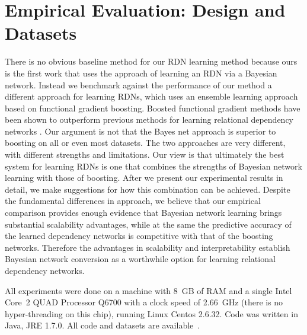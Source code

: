 \documentclass[runningheads,a4paper]{llncs}
\begin{document}
\section{Empirical Evaluation: Design and Datasets}\label{sec:empirical-comparison}
There is no obvious baseline method for our RDN learning method because ours is the first work that uses the approach of learning an RDN via a Bayesian network. Instead we benchmark against the performance of our method a different approach for learning RDNs, which uses an ensemble learning approach based on functional gradient boosting. Boosted functional gradient methods have been shown to outperform previous methods for learning relational dependency networks \cite{Khot2011,Natarajan2012}. Our argument is not that the Bayes net approach is superior to boosting on all or even most datasets. The two approaches are very different, with  different strengths and limitations. Our view is that  ultimately the best system for learning RDNs is one that combines the strengths of Bayesian network learning with those of boosting. After we present our experimental results in detail, we make suggestions for how this combination can be achieved. Despite the fundamental differences in approach, we believe that our empirical comparison provides enough evidence that Bayesian network learning brings substantial scalability advantages, while at the same the predictive accuracy of the learned dependency networks is competitive with that of the boosting networks. Therefore the advantages in scalability and interpretability establish Bayesian network conversion as a worthwhile option for learning relational dependency networks.  
%

All experiments were done on a machine with 8~GB of RAM and a single Intel Core~2 QUAD Processor Q6700 with a clock speed of 2.66~GHz (there is no hyper-threading on this chip), running Linux Centos 2.6.32. Code was written in Java, JRE 1.7.0. All code and datasets are available~\cite{bib:jbnsite}. 
\end{document}
